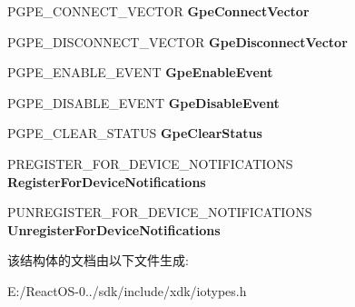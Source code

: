 \begin{DoxyCompactItemize}
P\+G\+P\+E\+\_\+\+C\+O\+N\+N\+E\+C\+T\+\_\+\+V\+E\+C\+T\+OR {\bfseries Gpe\+Connect\+Vector}
\item 
\mbox{\label{struct___a_c_p_i___i_n_t_e_r_f_a_c_e___s_t_a_n_d_a_r_d_aa8ee60f4c1fff27e85b22e7e169fc6b8}} 
P\+G\+P\+E\+\_\+\+D\+I\+S\+C\+O\+N\+N\+E\+C\+T\+\_\+\+V\+E\+C\+T\+OR {\bfseries Gpe\+Disconnect\+Vector}
\item 
\mbox{\label{struct___a_c_p_i___i_n_t_e_r_f_a_c_e___s_t_a_n_d_a_r_d_a5c5a258a5e760b48157df8eed6a7d798}} 
P\+G\+P\+E\+\_\+\+E\+N\+A\+B\+L\+E\+\_\+\+E\+V\+E\+NT {\bfseries Gpe\+Enable\+Event}
\item 
\mbox{\label{struct___a_c_p_i___i_n_t_e_r_f_a_c_e___s_t_a_n_d_a_r_d_ab397b3383c853545b87e7db33f2d1056}} 
P\+G\+P\+E\+\_\+\+D\+I\+S\+A\+B\+L\+E\+\_\+\+E\+V\+E\+NT {\bfseries Gpe\+Disable\+Event}
\item 
\mbox{\label{struct___a_c_p_i___i_n_t_e_r_f_a_c_e___s_t_a_n_d_a_r_d_a54732ab842518cbb4c48291c7e2d47db}} 
P\+G\+P\+E\+\_\+\+C\+L\+E\+A\+R\+\_\+\+S\+T\+A\+T\+US {\bfseries Gpe\+Clear\+Status}
\item 
\mbox{\label{struct___a_c_p_i___i_n_t_e_r_f_a_c_e___s_t_a_n_d_a_r_d_a5e8210b3d0c01d4e9c2c9c81a5127a03}} 
P\+R\+E\+G\+I\+S\+T\+E\+R\+\_\+\+F\+O\+R\+\_\+\+D\+E\+V\+I\+C\+E\+\_\+\+N\+O\+T\+I\+F\+I\+C\+A\+T\+I\+O\+NS {\bfseries Register\+For\+Device\+Notifications}
\item 
\mbox{\label{struct___a_c_p_i___i_n_t_e_r_f_a_c_e___s_t_a_n_d_a_r_d_a0a2bdd919b1a9bea2d79622668738fd8}} 
P\+U\+N\+R\+E\+G\+I\+S\+T\+E\+R\+\_\+\+F\+O\+R\+\_\+\+D\+E\+V\+I\+C\+E\+\_\+\+N\+O\+T\+I\+F\+I\+C\+A\+T\+I\+O\+NS {\bfseries Unregister\+For\+Device\+Notifications}
\end{DoxyCompactItemize}


该结构体的文档由以下文件生成\+:\begin{DoxyCompactItemize}
\item 
E\+:/\+React\+O\+S-\/0../sdk/include/xdk/iotypes.\+h\end{DoxyCompactItemize}
